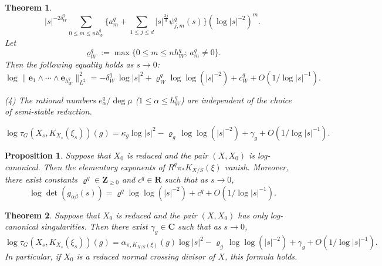 \documentclass[10pt,a4paper]{amsart}
\newtheorem{theorem}{Theorem}
\newtheorem{proposition}{Proposition}
\begin{document}
\begin{theorem}
\begin{equation}
|s|^{-2\delta_{W}^{q}} \sum_{0\leq m \leq n h_{W}^{q}} \{ a_{m}^{q} 
+ \sum_{1 \leq j \leq d} |s|^{\frac{2j}{d}} \psi_{j,m}^{q}(s) \} (\log |s|^{-2})^{m}. 
\end{equation}
Let
\begin{equation}
\label{eqn:rho:q}
\varrho_{W}^{q} := \max\{ 0 \leq m \leq n h_{W}^{q};\, a_{m}^{q} \not=0 \}.
\end{equation}
Then the following equality holds as $s\to 0$:
\begin{equation}
\label{eqn:asymptotoc:L2:X}
\log\| {\mathbf e}_{1}\wedge \cdots\wedge {\mathbf e}_{h_{W}^{q}} \|_{L^{2}}^{2} 
= -\delta_{W}^{q}\,\log |s|^{2} + \varrho_{W}^{q}\log\log(|s|^{-2}) + c_{W}^{q} + O\left(1/\log |s|^{-1} \right).
\end{equation}
\par{\rm (4) }
The rational numbers $e^{q}_{\alpha}/\deg \mu$ ($1 \leq \alpha \leq h_{W}^{q}$) are independent of the choice of semi-stable reduction.
\end{theorem}

\begin{equation}
\label{eqn:asymp:eq:tors}
\log \tau_{G}(X_{s},K_{X_{s}}(\xi_{s}))(g) = \kappa_{g} \log |s|^{2} - \varrho_{g}\,\log\log( |s|^{-2}) + \gamma_{g} + O\left(1/\log |s|^{-1} \right).
\end{equation}

\begin{proposition}
\label{prop:L2:log:can}
Suppose that $X_{0}$ is reduced and the pair $(X,X_{0})$ is log-canonical. 
Then the elementary exponents of $R^{q}\pi_{*}K_{X/S}(\xi)$ vanish.
Moreover, there exist constants $\varrho^{q} \in {\mathbf Z}_{\geq 0}$ and $c^{q} \in {\mathbf R}$ such that as $s\to0$,
\begin{equation}
\label{eqn:asymptotoc:L2:X:lc}
\log\det ( g_{\alpha\bar{\beta}}(s) )
= \varrho^{q} \log\log(|s|^{-2}) + c^{q} + O(1/\log |s|^{-1}).
\end{equation}
\end{proposition}

\begin{theorem}
\label{thm:sing:tor:log:can}
Suppose that $X_{0}$ is reduced and the pair $(X, X_{0})$ has only log-canonical singularities. 
Then there exist $\gamma_{g} \in {\mathbf C}$ such that as $s \to 0$,
$$
\log\tau_{G}(X_{s},K_{X_{s}}(\xi_{s}))(g) 
= \alpha_{\pi,K_{X/S}(\xi)}(g) \log |s|^{2} - \varrho_{g}\,\log\log( |s|^{-2}) + \gamma_{g} + O\left(1/\log |s|^{-1} \right).
$$
In particular, if $X_{0}$ is a reduced normal crossing divisor of $X$, this formula holds.
\end{theorem}
\end{document}
